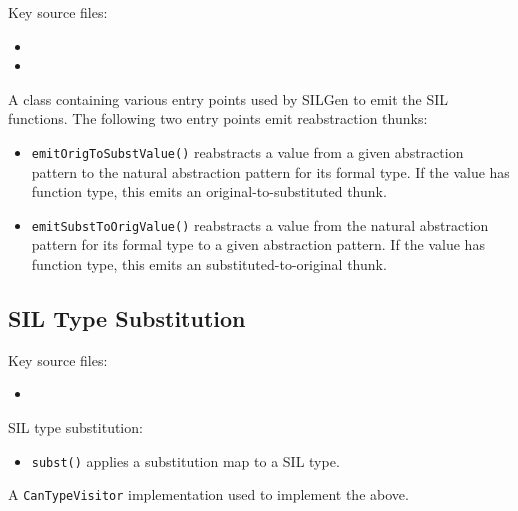 \documentclass[../generics]{subfiles}
\begin{document}
Key source files:
\begin{itemize}
\item {}
\item {}
\end{itemize}

A class containing various entry points used by SILGen to emit the SIL functions. The following two entry points emit reabstraction thunks:
\begin{itemize}
\item \texttt{emitOrigToSubstValue()} reabstracts a value from a given abstraction pattern to the natural abstraction pattern for its formal type. If the value has function type, this emits an original-to-substituted thunk.
\item \texttt{emitSubstToOrigValue()} reabstracts a value from the natural abstraction pattern for its formal type to a given abstraction pattern. If the value has function type, this emits an  substituted-to-original thunk.
\end{itemize}

\subsection*{SIL Type Substitution}

Key source files:
\begin{itemize}
\item {}
\end{itemize}

SIL type substitution:
\begin{itemize}
\item \texttt{subst()} applies a substitution map to a SIL type.
\end{itemize}

A \texttt{CanTypeVisitor} implementation used to implement the above.
\end{document}
